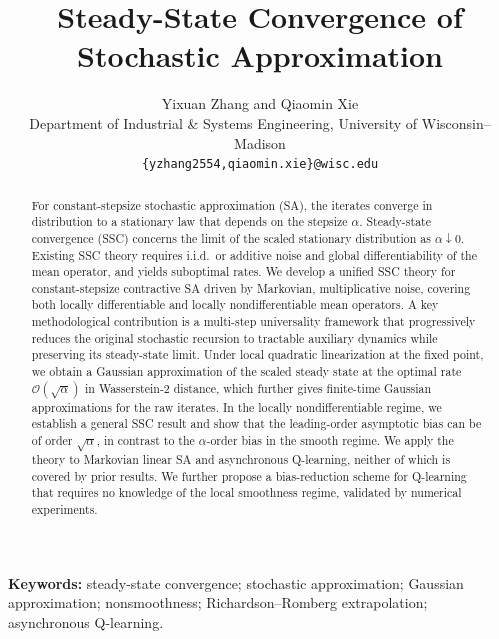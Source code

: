\documentclass[11pt,letterpaper]{article}
\title{Steady-State Convergence of Stochastic Approximation}
\author{
Yixuan Zhang and Qiaomin Xie
\\[0.8em]
Department of Industrial \& Systems Engineering, University of Wisconsin--Madison
\\
\texttt{\{yzhang2554,qiaomin.xie\}@wisc.edu}
}
\date{}
\theoremstyle{plain}
\theoremstyle{definition}
\theoremstyle{remark}
\begin{document}
\maketitle

\begin{abstract}
For constant-stepsize stochastic approximation (SA), the iterates converge in distribution to a stationary law that depends on the stepsize $\alpha.$
Steady-state convergence (SSC) concerns the limit of the scaled stationary distribution as $\alpha \downarrow 0.$ 
Existing SSC theory requires i.i.d.\ or additive noise and global differentiability of the mean operator, and yields suboptimal rates. We
develop a unified SSC theory for constant-stepsize contractive SA driven by Markovian, multiplicative noise, covering  both locally differentiable and locally nondifferentiable mean operators. A key methodological contribution is a multi-step
universality framework that progressively reduces the original stochastic
recursion to tractable auxiliary dynamics while preserving its steady-state
limit. Under local quadratic linearization at the fixed point, we obtain a Gaussian approximation of the scaled steady state at the optimal rate $\mathcal O(\sqrt{\alpha})$ in Wasserstein-2 distance, which further gives finite-time Gaussian approximations for the raw iterates. In the locally nondifferentiable regime, we establish a general SSC
result and show that the leading-order asymptotic bias can be of order
\(\sqrt{\alpha}\), in contrast to the $\alpha$-order bias in the smooth regime. We apply the theory to Markovian linear SA and asynchronous Q-learning,
neither of which is covered by prior results. We further propose a bias-reduction scheme for Q-learning that requires no knowledge of the local smoothness regime, validated by numerical experiments.

\end{abstract}

\noindent\textbf{Keywords:} steady-state convergence; stochastic approximation;
Gaussian approximation; nonsmoothness;
Richardson--Romberg extrapolation; asynchronous Q-learning.
\end{document}
